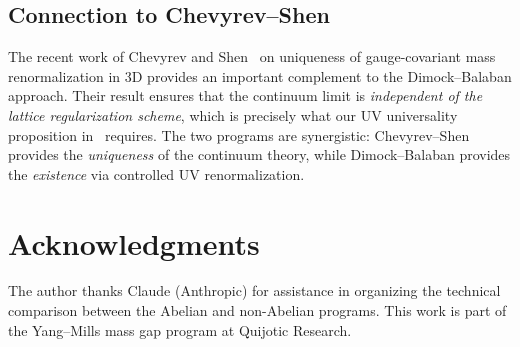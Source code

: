 \documentclass[11pt,a4paper]{article}
\theoremstyle{plain}
\theoremstyle{definition}
\theoremstyle{remark}
\begin{document}
\subsection{Connection to Chevyrev--Shen}

The recent work of Chevyrev and Shen~\cite{CS25}
on uniqueness of gauge-covariant mass renormalization
in 3D provides an important complement to the
Dimock--Balaban approach. Their result ensures that
the continuum limit is \emph{independent of the
lattice regularization scheme}, which is precisely
what our UV universality proposition
in~\cite{FontesEuclidean} requires. The two programs
are synergistic: Chevyrev--Shen provides the
\emph{uniqueness} of the continuum theory, while
Dimock--Balaban provides the \emph{existence}
via controlled UV renormalization.

\section*{Acknowledgments}

The author thanks Claude (Anthropic) for assistance
in organizing the technical comparison between the
Abelian and non-Abelian programs. This work is part
of the Yang--Mills mass gap program at Quijotic Research.
\end{document}
